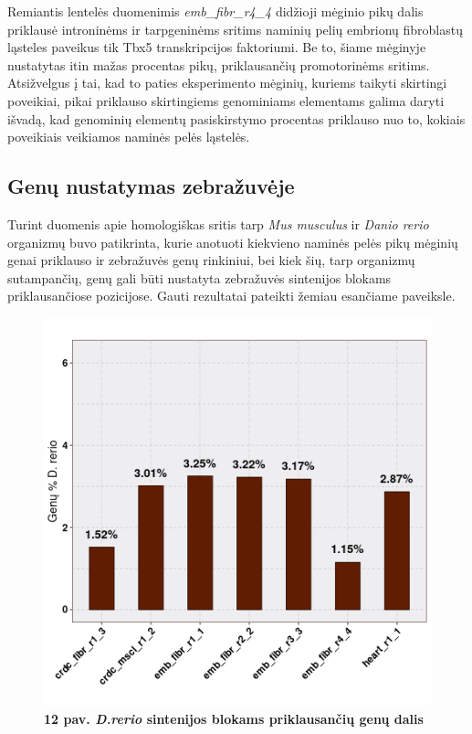 \documentclass[12pt]{article}
\begin{document}
Remiantis lentelės duomenimis \emph{emb\_fibr\_r4\_4} didžioji mėginio pikų
dalis priklausė introninėms ir tarpgeninėms sritims naminių pelių embrionų
fibroblastų ląsteles paveikus tik Tbx5 transkripcijos faktoriumi. Be to, šiame
mėginyje nustatytas itin mažas procentas pikų, prik\-lau\-san\-čių promotorinėms
sritims. Atsižvelgus į tai, kad to paties eksperimento mėginių, kuriems taikyti
skirtingi poveikiai, pikai priklauso skirtingiems genominiams elementams galima
daryti išvadą, kad genominių elementų pasiskirstymo procentas priklauso nuo to,
kokiais poveikiais veikiamos naminės pelės ląstelės.

\newpage

\subsection{Genų nustatymas zebražuvėje}
Turint duomenis apie homologiškas sritis tarp \emph{Mus musculus} ir
\emph{Danio rerio} organizmų buvo patikrinta, kurie anotuoti kiekvieno naminės
pelės pikų mėginių genai priklauso ir zebražuvės genų rinkiniui, bei kiek šių,
tarp organizmų sutampančių, genų gali būti nustatyta zebražuvės sintenijos
blokams priklausančiose pozicijose. Gauti rezultatai pateikti žemiau esančiame
paveiksle.

\begin{figure}[htb]
    \begin{center}
        \includegraphics[width=0.7\linewidth]{../Figures/Unique_genes_DR.png}
        \vspace{-2\baselineskip}
        \caption*{\small\textbf{12 pav. \emph{D.rerio} sintenijos blokams
                                priklausančių genų dalis}}
        \label{fig:12}
    \end{center}
\end{figure}
\end{document}
